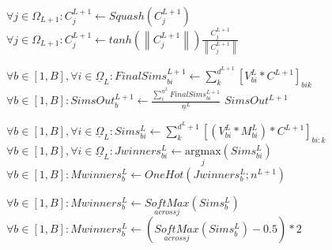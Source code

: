 {\begin{algorithm}[h]
\begin{algorithmic}[1]
            \State $\forall j \in \Omega_{L+1}: C_j^{L+1} \gets Squash(C_j^{L+1})$
          \Else
            \State $\forall j \in \Omega_{L+1}: C_j^{L+1} \gets tanh(\left\lVert C_j^{L+1}\right\rVert ) \frac{C_j^{L+1}}{\left\lVert C_j^{L+1}\right\rVert }$
          \EndIf
        \EndIf

      \EndFor
      


      \State $\forall b \in [1,B], \forall i \in \underline{\Omega}_L: FinalSims^{L+1}_{bi} \gets \sum_k^{d^{L+1}} [V^L_{bi} \ast C^{L+1}]_{bik}$
      \State {}
      \State $\forall b \in [1,B]: SimsOut_b^{L+1} \gets \frac{\sum_i^{\underline{n}^L} FinalSims^{L+1}_{bi}}{\underline{n}^L}$
      \State \Return $SimsOut^{L+1}$ 
    \EndProcedure
  \end{algorithmic}
  \end{algorithm}

\begin{algorithm}
  \begin{algorithmic}
      \ForAll{$\theta \in \Theta$}
            \State $\forall b \in [1,B], \forall i \in \underline{\Omega}_L: Sims^L_{bi} \gets \sum_k^{d^L+1} [(V^L_{bi} \ast M^L_{bi}) \ast C^{L+1}]_{bi:k}$
            \State {}
              \State $\forall b \in [1,B], \forall i \in \underline{\Omega}_L: Jwinners^L_{bi} \gets \underset{j}{\mathrm{argmax}}(Sims^L_{bi})$
              \State {}
              \State $\forall b \in [1,B]: Mwinners^L_b \gets OneHot(Jwinners^L_{b};n^{L+1})$
              
              \State $\forall b \in [1,B]: Mwinners^L_{b} \gets \underset{across j}{SoftMax}(Sims^L_b)$
              \State $\forall b \in [1,B]: Mwinners^L_b \gets (\underset{across j}{SoftMax}(Sims^L_b) - 0.5) \ast 2$
            \EndIf
            \State {}


\end{algorithmic}
\end{algorithm}}
